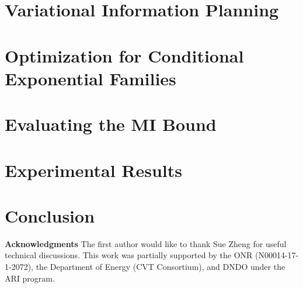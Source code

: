 \documentclass[twoside]{article}
\begin{document}
\section{Variational Information Planning}\label{sec:varplan}


\section{Optimization for Conditional Exponential Families}\label{sec:optim}


\section{Evaluating the MI Bound}\label{sec:eval}


\section{Experimental Results}\label{sec:experiments}


\section{Conclusion}


\textbf{Acknowledgments} The first author would like to thank Sue
Zheng for useful technical discussions.  This work was partially
supported by the ONR (N00014-17-1-2072), the Department of Energy
(CVT Consortium), and DNDO under the ARI program.



\end{document}
